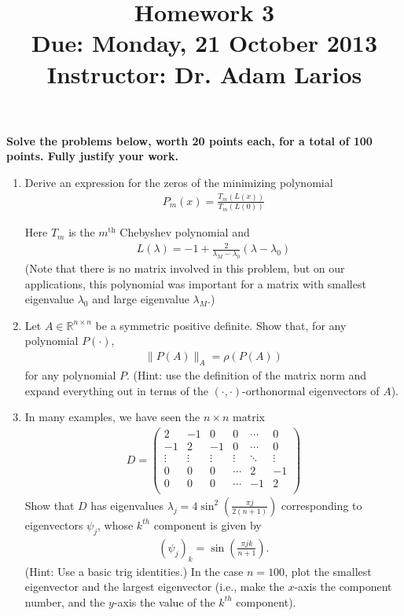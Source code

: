 \documentclass[11pt]{amsart}
\theoremstyle{plain}
\theoremstyle{definition}
\theoremstyle{remark}
\newcommand{\field}[1]{\mathbb{#1}}
\newcommand{\nR}{\field{R}}
\newcommand{\pnt}[1]{\left(#1\right)}
\newcounter{my_counter}
\begin{document}
\title{Homework 3
\\\vspace{0.2cm}\scriptsize{Due: Monday, 21 October 2013}
\\\scriptsize{Instructor: Dr. Adam Larios}}
\maketitle
\thispagestyle{empty}

\noindent \textbf{Solve the problems below, worth 20 points each, for a total of 100 points.  Fully justify your work.}
\begin{enumerate}

\item Derive an expression for the zeros of the minimizing polynomial
\begin{align*}
P_m (x) =\frac{T_m (L(x))}{T_m (L(0))}
\end{align*}

Here $T_m$ is the $m^{\text{th}}$ Chebyshev polynomial and
\begin{align*}
 L(\lambda) = -1 + \frac{2}{\lambda_M-\lambda_0}(\lambda-\lambda_0)
\end{align*}
(Note that there is no matrix involved in this problem, but on our applications, this polynomial was important for a matrix with smallest eigenvalue $\lambda_0$ and large eigenvalue $\lambda_M$.)

\item Let $A\in \nR^{n\times n}$ be a symmetric positive definite.  Show that, for any polynomial $P(\cdot)$, 
\begin{align*}
 \|P(A)\|_A = \rho(P(A))
\end{align*}
for any polynomial $P$.  (Hint: use the definition of the matrix norm and expand everything out in terms of the $(\cdot,\cdot)$-orthonormal eigenvectors of $A$).

\item In many examples, we have seen the $n\times n$ matrix
\begin{align*}
 D = \begin{pmatrix}
      2 & -1 & 0 & 0&\cdots& 0\\
      -1 & 2 & -1 & 0&\cdots &0\\
      \vdots &\vdots &\vdots &\vdots &\ddots&\vdots\\
      0& 0 & 0 &\cdots &2 & -1\\
      0& 0 & 0 &\cdots &-1 & 2\\
     \end{pmatrix}
\end{align*}
Show that $D$ has eigenvalues $\lambda_j=4\sin^2\pnt{\frac{\pi j}{2(n+1)}}$ corresponding to eigenvectors $\psi_j$, whose $k^{th}$ component is given by
\begin{align*}
 (\psi_j)_k = \sin\pnt{\frac{\pi j k}{n+1}}.
\end{align*}
(Hint: Use a basic trig identities.)  
In the case $n=100$, plot the smallest eigenvector and the largest eigenvector (i.e., make the $x$-axis the component number, and the $y$-axis the value of the $k^{th}$ component).  


\end{enumerate}
\end{document}
